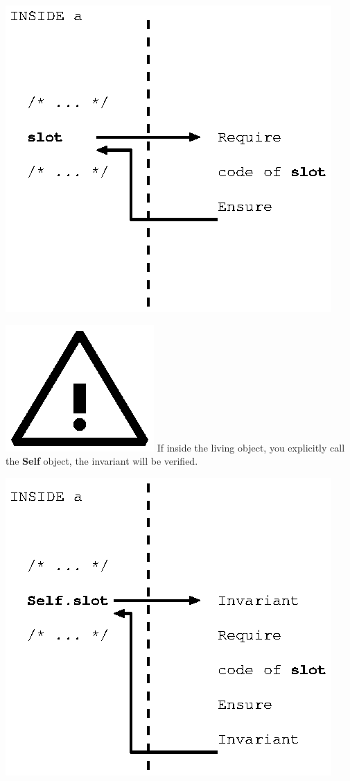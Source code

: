 \documentclass[11pt]{mybook}
\newcommand{\warning}{\includegraphics[scale=0.3]{figures/warning}}
\begin{document}
\begin{center}
\includegraphics[scale=1.3]{figures/invariant2}
\end{center}
\warning{} If inside the living object, you explicitly call the {\bf{}Self} object, the invariant will be verified.
\begin{center}
\includegraphics[scale=1.3]{figures/invariant3}
\end{center}

\end{document}
